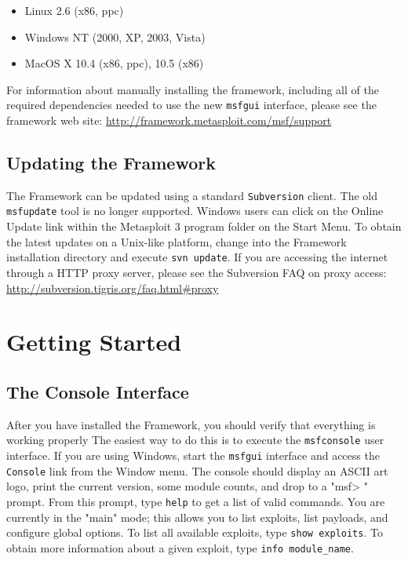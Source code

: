 \documentclass{report}
\begin{document}
\begin{itemize}
\item Linux 2.6 (x86, ppc)
\item Windows NT (2000, XP, 2003, Vista)
\item MacOS X 10.4 (x86, ppc), 10.5 (x86)
\end{itemize}

\par
For information about manually installing the framework, including all of the required dependencies needed
to use the new \texttt{msfgui} interface, please see the framework web site: \url{http://framework.metasploit.com/msf/support}

    \section{Updating the Framework}
    \label{INSTALL-UPDATE}

\par
The Framework can be updated using a standard \texttt{Subversion} client. The
old \texttt{msfupdate} tool is no longer supported. Windows users can click on
the Online Update link within the Metasploit 3 program folder on the Start Menu.
To obtain the latest updates on a Unix-like platform, change into the Framework 
installation directory and execute \texttt{svn update}. If you are accessing the
internet through a HTTP proxy server, please see the Subversion FAQ on proxy 
access: \url{http://subversion.tigris.org/faq.html#proxy}

\pagebreak

\chapter{Getting Started}

    \section{The Console Interface}
    \label{STARTED-CONSOLE}

\par
After you have installed the Framework, you should verify that everything is
working properly  The easiest way to do this is to execute the
\texttt{msfconsole} user interface. If you are using Windows, start the \texttt{msfgui}
interface and access the \texttt{Console} link from the Window menu.
The console should display an ASCII art logo, print the current version, some module
counts, and drop to a "msf> " prompt. From this prompt, type \texttt{help} to get a list of
valid commands. You are currently in the "main" mode; this allows you to list
exploits, list payloads, and configure global options.  To list all available
exploits, type \texttt{show exploits}. To obtain more information about a given
exploit, type \texttt{info module\_name}. 
\end{document}
